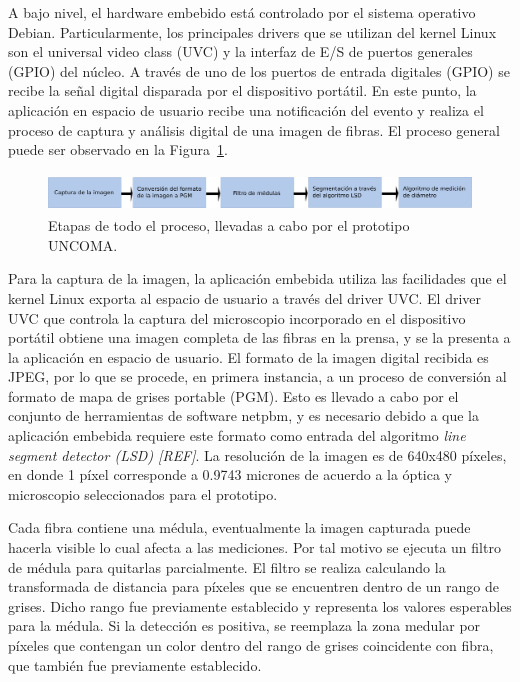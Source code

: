 \documentclass[runningheads,a4paper]{llncs}
\begin{document}
A bajo nivel, el hardware embebido está controlado por el sistema operativo Debian. Particularmente, los principales drivers que se utilizan del kernel Linux son el universal video class (UVC) y la interfaz de E/S de puertos generales (GPIO) del núcleo.
A través de uno de los puertos de entrada digitales (GPIO) se recibe la señal digital disparada por el dispositivo portátil. En este punto, la aplicación en espacio de usuario recibe una notificación del evento y realiza el proceso de captura y análisis digital de una imagen de fibras. El proceso general puede ser observado en la Figura~\ref{fig:proceso}.
\begin{figure}
\centering
\includegraphics[height=1cm]{proceso}
\caption{Etapas de todo el proceso, llevadas a cabo por el prototipo UNCOMA.}
\label{fig:proceso}
\end{figure}
Para la captura de la imagen, la aplicación embebida utiliza las facilidades que el kernel Linux exporta al espacio de usuario a través del driver UVC. El driver UVC que controla la captura del microscopio incorporado en el dispositivo portátil obtiene una imagen completa de las fibras en la prensa, y se la presenta a la aplicación en espacio de usuario.
El formato de la imagen digital recibida es JPEG, por lo que se procede, en primera instancia, a un proceso de conversión al formato de mapa de grises portable (PGM). Esto es llevado a cabo por el conjunto de herramientas de software netpbm, y es necesario debido a que la aplicación embebida requiere este formato como entrada del algoritmo {\it line segment detector (LSD) [REF]}.
La resolución de la imagen es de 640x480 píxeles, en donde 1 píxel corresponde a 0.9743 micrones de acuerdo a la óptica y microscopio seleccionados para el prototipo.

Cada fibra contiene una médula, eventualmente la imagen capturada puede hacerla visible lo cual afecta a 
las mediciones. Por tal motivo se ejecuta un filtro de médula para quitarlas parcialmente. El filtro se realiza calculando la transformada de distancia para píxeles que se encuentren dentro de un rango de grises. 
Dicho rango fue previamente establecido y representa los valores esperables para la médula. Si la detección es positiva, se reemplaza la zona medular por píxeles que contengan un color dentro del rango de grises  
coincidente con fibra, que también fue previamente establecido.
\end{document}
